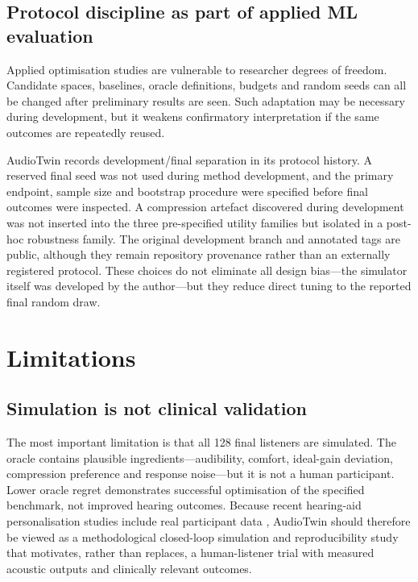 \documentclass[preprint,12pt]{elsarticle}
\begin{document}
\subsection{Protocol discipline as part of applied ML evaluation}

Applied optimisation studies are vulnerable to researcher degrees of freedom. Candidate spaces, baselines, oracle definitions, budgets and random seeds can all be changed after preliminary results are seen. Such adaptation may be necessary during development, but it weakens confirmatory interpretation if the same outcomes are repeatedly reused.

AudioTwin records development/final separation in its protocol history. A reserved final seed was not used during method development, and the primary endpoint, sample size and bootstrap procedure were specified before final outcomes were inspected. A compression artefact discovered during development was not inserted into the three pre-specified utility families but isolated in a post-hoc robustness family. The original development branch and annotated tags are public, although they remain repository provenance rather than an externally registered protocol. These choices do not eliminate all design bias---the simulator itself was developed by the author---but they reduce direct tuning to the reported final random draw.

\section{Limitations}
\label{sec:limitations}

\subsection{Simulation is not clinical validation}

The most important limitation is that all 128 final listeners are simulated. The oracle contains plausible ingredients---audibility, comfort, ideal-gain deviation, compression preference and response noise---but it is not a human participant. Lower oracle regret demonstrates successful optimisation of the specified benchmark, not improved hearing outcomes. Because recent hearing-aid personalisation studies include real participant data \cite{vyas2022,akbarzadeh2022,ni2024}, AudioTwin should therefore be viewed as a methodological closed-loop simulation and reproducibility study that motivates, rather than replaces, a human-listener trial with measured acoustic outputs and clinically relevant outcomes.
\end{document}

